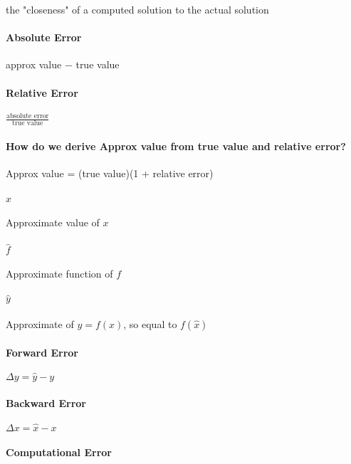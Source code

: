 \documentclass[12pt]{article}
\begin{document}
the "closeness" of a computed solution to the actual solution

\paragraph{Absolute Error}

approx value − true value

\paragraph{Relative Error}

$\frac{\text{absolute error}}{\text{true value}}$

\paragraph{How do we derive Approx value from true value and relative error?}

Approx value = (true value)(1 + relative error)

\paragraph{$\hat{x}$}

Approximate value of $x$

\paragraph{$\hat{f}$}

Approximate function of $f$

\paragraph{$\hat{y}$}

Approximate of $y=f(x)$, so equal to $f(\hat{x})$

\paragraph{Forward Error}

$\Delta y = \hat{y} - y$

\paragraph{Backward Error}

$\Delta x = \hat{x} - x$

\paragraph{Computational Error}
\end{document}
